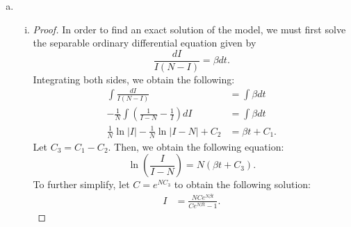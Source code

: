 \documentclass[12pt]{article}
\begin{document}
\begin{enumerate}[(a)]
{\begin{proof}
In order to prove global asymptotic stability, we observe that as the magnitude of $I$ gets arbitrarily large, $L(I)$ also gets arbitrarily large. In other words, $L(I) \to \infty$ as $|I| \to \infty$, and $L$ is thus radially unbounded. Since $L(I)$ is radially unbounded, and $L(I) < 0$ $\forall \ I \in \Delta \setminus \{I_\ast\}$, it follows by LaSalle's Invariance Principle that the endemic equilibrium is globally asymptotically stable.
    \end{proof}
  }
  
\item \SIanalQb
  \begin{enumerate}[(i)]
  \item \SIanalQbi
    
    {\color{blue}
      \begin{proof}
        In order to find an exact solution of the model, we must first solve the separable ordinary differential equation given by
\begin{equation*}
\frac{dI}{I(N-I)} = \beta dt.
\end{equation*}
Integrating both sides, we obtain the following:
\begin{equation*}
\begin{aligned}
\int \frac{dI}{I(N-I)} &= \int \beta dt \\
- \frac{1}{N} \int \left(\frac{1}{I-N} - \frac{1}{I}\right) dI &= \int \beta dt\\
\frac{1}{N} \ln{|I|} - \frac{1}{N} \ln{|I-N|} + C_2 &= \beta t + C_1.
\end{aligned}
\end{equation*}
Let $C_3 = C_1 - C_2$. Then, we obtain the following equation:
\begin{equation*}
\ln{\left(\frac{I}{I-N}\right)} = N(\beta t + C_3).
\end{equation*}
To further simplify, let $C = e^{NC_3}$ to obtain the following solution:
\begin{equation}
\begin{aligned}
I &= \frac{NCe^{N \beta t}}{Ce^{N \beta t} - 1}.
\label{genI}
\end{aligned}
\end{equation}


\end{proof}}
\end{enumerate}
\end{enumerate}
\end{document}
